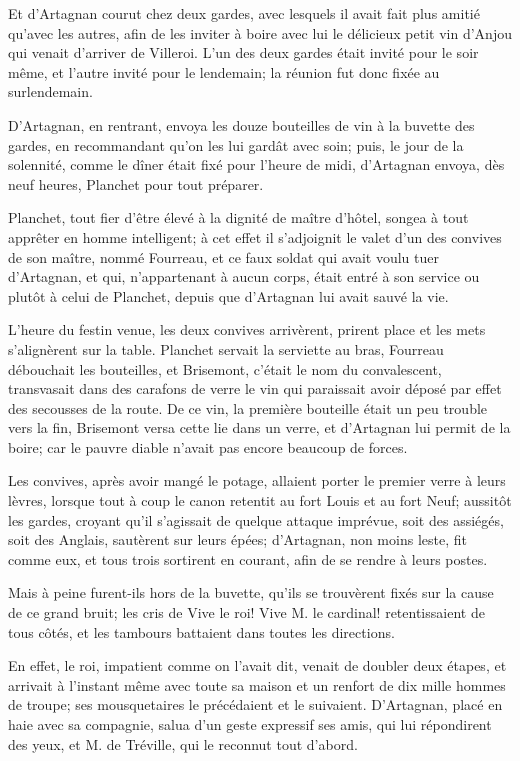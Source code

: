 Et d'Artagnan courut chez deux gardes, avec lesquels il avait fait plus amitié qu'avec les autres, afin de les inviter à boire avec lui le délicieux petit vin d'Anjou qui venait d'arriver de Villeroi. L'un des deux gardes était invité pour le soir même, et l'autre invité pour le lendemain; la réunion fut donc fixée au surlendemain. 

D'Artagnan, en rentrant, envoya les douze bouteilles de vin à la buvette des gardes, en recommandant qu'on les lui gardât avec soin; puis, le jour de la solennité, comme le dîner était fixé pour l'heure de midi, d'Artagnan envoya, dès neuf heures, Planchet pour tout préparer. 

Planchet, tout fier d'être élevé à la dignité de maître d'hôtel, songea à tout apprêter en homme intelligent; à cet effet il s'adjoignit le valet d'un des convives de son maître, nommé Fourreau, et ce faux soldat qui avait voulu tuer d'Artagnan, et qui, n'appartenant à aucun corps, était entré à son service ou plutôt à celui de Planchet, depuis que d'Artagnan lui avait sauvé la vie. 

L'heure du festin venue, les deux convives arrivèrent, prirent place et les mets s'alignèrent sur la table. Planchet servait la serviette au bras, Fourreau débouchait les bouteilles, et Brisemont, c'était le nom du convalescent, transvasait dans des carafons de verre le vin qui paraissait avoir déposé par effet des secousses de la route. De ce vin, la première bouteille était un peu trouble vers la fin, Brisemont versa cette lie dans un verre, et d'Artagnan lui permit de la boire; car le pauvre diable n'avait pas encore beaucoup de forces. 

Les convives, après avoir mangé le potage, allaient porter le premier verre à leurs lèvres, lorsque tout à coup le canon retentit au fort Louis et au fort Neuf; aussitôt les gardes, croyant qu'il s'agissait de quelque attaque imprévue, soit des assiégés, soit des Anglais, sautèrent sur leurs épées; d'Artagnan, non moins leste, fit comme eux, et tous trois sortirent en courant, afin de se rendre à leurs postes. 

Mais à peine furent-ils hors de la buvette, qu'ils se trouvèrent fixés sur la cause de ce grand bruit; les cris de Vive le roi! Vive M. le cardinal! retentissaient de tous côtés, et les tambours battaient dans toutes les directions. 

En effet, le roi, impatient comme on l'avait dit, venait de doubler deux étapes, et arrivait à l'instant même avec toute sa maison et un renfort de dix mille hommes de troupe; ses mousquetaires le précédaient et le suivaient. D'Artagnan, placé en haie avec sa compagnie, salua d'un geste expressif ses amis, qui lui répondirent des yeux, et M. de Tréville, qui le reconnut tout d'abord. 

